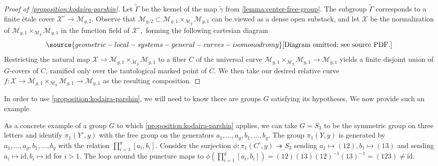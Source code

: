 \subsubsection{}\label{subsubsection:proof-kodaira-parshin}\begin{proof}[Proof of \autoref{proposition:kodaira-parshin}]
Let $\widetilde{\Gamma}$ be the kernel of the map $\widetilde{\gamma}$ from
\autoref{lemma:center-free-group}.
The subgroup $\widetilde{\Gamma}$ corresponds to a finite \'etale cover
$\mathscr X^\circ \to \mathscr M_{g,2}$.
Observe that $\mathscr M_{g,2} \subset \mathscr{M}_{g,1} \times_{\mathscr M_g} \mathscr{M}_{g,1}$
can be viewed as a dense open substack, and
let $\mathscr{X}$ be the normalization
of $\mathscr{M}_{g,1} \times_{\mathscr M_g} \mathscr{M}_{g,1}$ in the function
field of $\mathscr{X}^\circ,$ forming the following cartesian diagram
\begin{equation}
	\label{equation:}
\source{geometric-local-systems-general-curves-isomonodromy}
	\text{[Diagram omitted; see source PDF.]}\end{equation}
Restricting the natural map $\mathscr{X}\to\mathscr{M}_{g,1} \times_{\mathscr M_g} \mathscr{M}_{g,1}$ to a fiber $C$ of the universal curve $\mathscr{M}_{g,1} \times_{\mathscr M_g} \mathscr{M}_{g,1} \to \mathscr M_{g,1}$ yields a finite disjoint union of $G$-covers of $C$, ramified only over the tautological marked point of $C$.
We then take our desired relative curve $f: \mathscr X \to \mathscr{M}_{g,1} \times_{\mathscr M_g}
\mathscr{M}_{g,1} \to \mathscr M_{g,1}$ as the resulting
composition.
\end{proof}

In order to use \autoref{proposition:kodaira-parshin}, we will need to know
there are groups $G$ satisfying its hypotheses. We now provide such an example.
\begin{example}
\notready
	\label{example:kodaira-parshin}
	As a concrete example of a group $G$ to which
	\autoref{proposition:kodaira-parshin} applies, we can take $G = S_3$ to be the
	symmetric group on three letters and identify $\pi_1(Y^\circ, y)$
with the free group on the generators $a_1, \ldots, a_g, b_1, \ldots, b_g$. The group $\pi_1(Y, y)$
is generated by $a_1, \ldots, a_g, b_1, \ldots, b_g$ with the relation
$\prod_{i=1}^g \left[ a_i, b_i \right]$.
Consider the surjection $\phi: \pi_1(C^\circ, y)\twoheadrightarrow S_3$
sending $a_1\mapsto (12), b_1 \mapsto (13)$ and sending $a_i \mapsto
\mathrm{id}, b_i
\mapsto \mathrm{id}$ for $i > 1$.
The loop around the puncture maps to
$\phi(\prod_{i=1}^g \left[ a_i, b_i \right]) = (12)(13)(12)^{-1}(13)^{-1} =
(123) \neq \mathrm{id}$.
\end{example}



